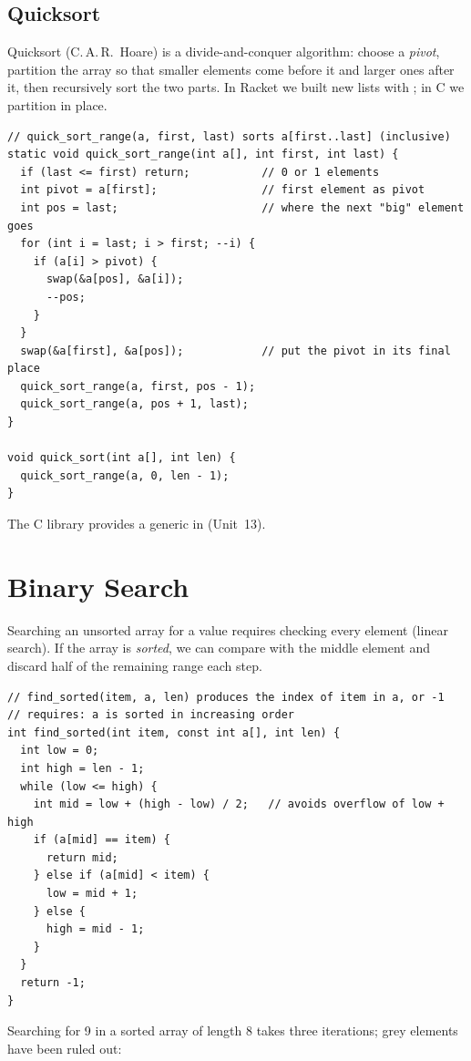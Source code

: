 \subsection{Quicksort}

Quicksort (C.\,A.\,R.~Hoare) is a divide-and-conquer algorithm: choose a \emph{pivot}, partition
the array so that smaller elements come before it and larger ones after it, then recursively
sort the two parts. In Racket we built new lists with ; in C we partition in place.
\begin{lstlisting}[style=c]
// quick_sort_range(a, first, last) sorts a[first..last] (inclusive)
static void quick_sort_range(int a[], int first, int last) {
  if (last <= first) return;           // 0 or 1 elements
  int pivot = a[first];                // first element as pivot
  int pos = last;                      // where the next "big" element goes
  for (int i = last; i > first; --i) {
    if (a[i] > pivot) {
      swap(&a[pos], &a[i]);
      --pos;
    }
  }
  swap(&a[first], &a[pos]);            // put the pivot in its final place
  quick_sort_range(a, first, pos - 1);
  quick_sort_range(a, pos + 1, last);
}

void quick_sort(int a[], int len) {
  quick_sort_range(a, 0, len - 1);
}
\end{lstlisting}
The C library provides a generic  in  (Unit~13).

\section{Binary Search}

Searching an unsorted array for a value requires checking every element (linear search). If the
array is \emph{sorted}, we can compare with the middle element and discard half of the
remaining range each step.
\begin{lstlisting}[style=c]
// find_sorted(item, a, len) produces the index of item in a, or -1
// requires: a is sorted in increasing order
int find_sorted(int item, const int a[], int len) {
  int low = 0;
  int high = len - 1;
  while (low <= high) {
    int mid = low + (high - low) / 2;   // avoids overflow of low + high
    if (a[mid] == item) {
      return mid;
    } else if (a[mid] < item) {
      low = mid + 1;
    } else {
      high = mid - 1;
    }
  }
  return -1;
}
\end{lstlisting}

Searching for 9 in a sorted array of length 8 takes three iterations; grey
elements have been ruled out:

